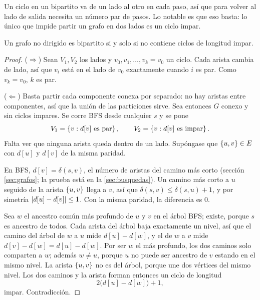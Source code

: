 \documentclass[11pt,letterpaper]{article}
\begin{document}
Un ciclo en un bipartito va de un lado al otro en cada paso, así que
para volver al lado de salida necesita un número par de pasos. Lo
notable es que eso basta: lo único que impide partir un grafo en dos
lados es un ciclo impar.

\begin{teorema}
  \label{teo:bipartito-ciclos}
  Un grafo no dirigido es bipartito si y solo si no contiene ciclos
  de longitud impar.
\end{teorema}

\begin{proof}
  ($\Rightarrow$) Sean $V_1, V_2$ los lados y
  $v_0, v_1, \dots, v_k = v_0$ un ciclo. Cada arista cambia de lado,
  así que $v_i$ está en el lado de $v_0$ exactamente cuando $i$ es
  par. Como $v_k = v_0$, $k$ es par.

  ($\Leftarrow$) Basta partir cada componente conexa por separado: no
  hay aristas entre componentes, así que la unión de las particiones
  sirve. Sea entonces $G$ conexo y sin ciclos impares. Se corre BFS
  desde cualquier $s$ y se pone
  \[
    V_1 = \left\{ v : d[v] \text{ es par} \right\} , \qquad
    V_2 = \left\{ v : d[v] \text{ es impar} \right\} .
  \]
  Falta ver que ninguna arista queda dentro de un lado. Supóngase que
  $\left\{ u, v \right\} \in E$ con $d[u]$ y $d[v]$ de la misma paridad.

   En BFS, $d[v] = \delta(s, v)$, el
  número de aristas del camino más corto (sección \ref{sec:grafos};
  la prueba está en la \ref{sec:busquedas}). Un camino más corto a $u$
  seguido de la arista $\left\{ u, v \right\}$ llega a $v$, así que
  $\delta(s, v) \le \delta(s, u) + 1$, y por simetría
  $\left\lvert d[u] - d[v] \right\rvert \le 1$. Con la misma paridad, la diferencia es
  $0$.

   Sea $w$ el ancestro común más profundo de
  $u$ y $v$ en el árbol BFS; existe, porque $s$ es ancestro de todos.
  Cada arista del árbol baja exactamente un nivel, así que el camino
  del árbol de $w$ a $u$ mide $d[u] - d[w]$, y el de $w$ a $v$ mide
  $d[v] - d[w] = d[u] - d[w]$. Por ser $w$ el más profundo, los dos
  caminos solo comparten a $w$; además $w \ne u$, porque $u$ no puede
  ser ancestro de $v$ estando en el mismo nivel. La arista
  $\left\{ u, v \right\}$ no es del árbol, porque une dos vértices del mismo
  nivel. Los dos caminos y la arista forman entonces un ciclo de
  longitud
  \[
    2\bigl(d[u] - d[w]\bigr) + 1 ,
  \]
  impar. Contradicción.
\end{proof}
\end{document}
